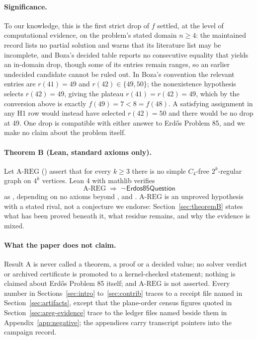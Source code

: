 \documentclass{anvil-paper}
\newcommand{\AREG}{\mathrm{A\text{-}REG}}
\newcommand{\Qn}{\textsf{Erdos85Question}}
\theoremstyle{definition}
\begin{document}
\paragraph{Significance.} To our knowledge, this is the first strict drop of $f$ settled, at the level of computational evidence, on the problem's stated domain $n\ge 4$: the maintained record \citep{bloom-erdos85} lists no partial solution and warns that its literature list may be incomplete, and Boza's decided table \citep{boza2024ramsey} reports no consecutive equality that yields an in-domain drop, though some of its entries remain ranges, so an earlier undecided candidate cannot be ruled out. In Boza's convention the relevant entries are $r(41)=49$ and $r(42)\in\{49,50\}$; the nonexistence hypothesis selects $r(42)=49$, giving the plateau $r(41)=r(42)=49$, which by the conversion above is exactly $f(49)=7<8=f(48)$. A satisfying assignment in any H1 row would instead have selected $r(42)=50$ and there would be no drop at 49. One drop is compatible with either answer to Erdős Problem 85, and we make no claim about the problem itself.

\paragraph{Theorem B (Lean, standard axioms only).} Let $\AREG$ () assert that for every $k\ge 3$ there is no simple $C_4$-free $2^k$-regular graph on $4^k$ vertices. Lean 4 \citep{moura2021lean4} with mathlib \citep{mathlib2020} verifies
\[
\AREG \;\Rightarrow\; \neg\,\Qn
\]
as , depending on no axioms beyond ,  and . $\AREG$ is an unproved hypothesis with a stated rival, not a conjecture we endorse: Section~\ref{sec:theoremB} states what has been proved beneath it, what residue remains, and why the evidence is mixed.

\paragraph{What the paper does not claim.} Result A is never called a theorem, a proof or a decided value; no solver verdict or archived certificate is promoted to a kernel-checked statement; nothing is claimed about Erdős Problem 85 itself; and $\AREG$ is not asserted. Every number in Sections~\ref{sec:intro} to~\ref{sec:contrib} traces to a receipt file named in Section~\ref{sec:artifacts}, except that the plane-order census figures quoted in Section~\ref{sec:areg-evidence} trace to the ledger files named beside them in Appendix~\ref{app:negative}; the appendices carry transcript pointers into the campaign record.
\end{document}
